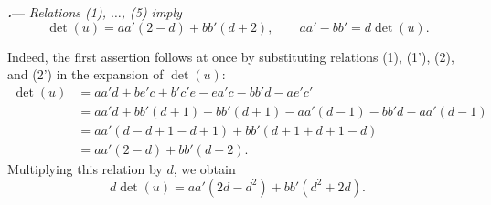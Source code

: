 \par\medskip\noindent
{}\textbf{\textit{.}}---
\textit{Relations \textup{(1)}, \(\ldots\), \textup{(5)} imply}
\[
  \det(u)=aa'(2-d)+bb'(d+2),
  \qquad
  aa'-bb'=d\det(u).
\]

Indeed, the first assertion follows at once by substituting
relations \textup{(1)}, \textup{(1')}, \textup{(2)}, and
\textup{(2')} in the expansion of \(\det(u)\):
\[
\begin{aligned}
  \det(u)
  &=aa'd+be'c+b'c'e-ea'c-bb'd-ae'c'\\
  &=aa'd+bb'(d+1)+bb'(d+1)
    -aa'(d-1)-bb'd-aa'(d-1)\\
  &=aa'(d-d+1-d+1)+bb'(d+1+d+1-d)\\
  &=aa'(2-d)+bb'(d+2).
\end{aligned}
\]
Multiplying this relation by \(d\), we obtain
\[
  d\det(u)=aa'(2d-d^2)+bb'(d^2+2d).
\]

